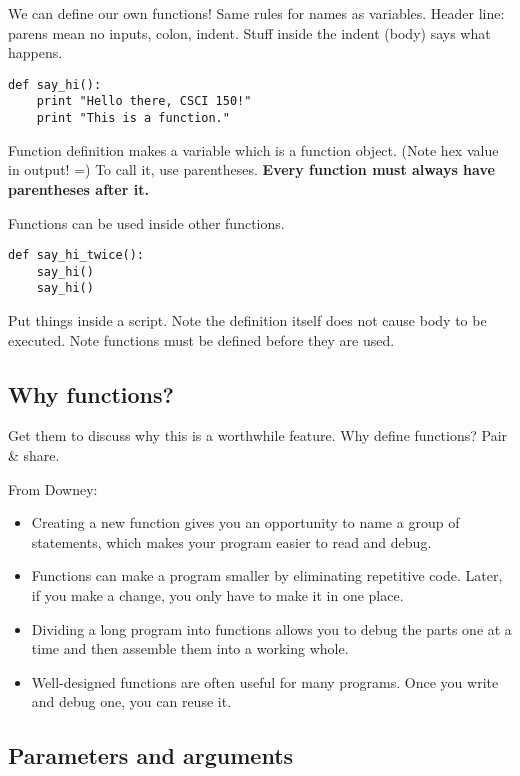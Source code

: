 \documentclass{article}
\begin{document}
We can define our own functions!  Same rules for names as
variables. Header line: parens mean no inputs, colon, indent.  Stuff
inside the indent (body) says what happens.

\begin{verbatim}
def say_hi():
    print "Hello there, CSCI 150!"
    print "This is a function."
\end{verbatim}

Function definition makes a variable which is a function object. (Note
hex value in output! =) To call it, use parentheses.  \textbf{Every
  function must always have parentheses after it.}

Functions can be used inside other functions.

\begin{verbatim}
def say_hi_twice():
    say_hi()
    say_hi()
\end{verbatim}

Put things inside a script.  Note the definition itself does not cause
body to be executed.  Note functions must be defined before they are
used.

\subsection*{Why functions?}

Get them to discuss why this is a worthwhile feature.  Why define
functions?  Pair \& share.

From Downey:

\begin{itemize}
\item Creating a new function gives you an opportunity to name a group
  of statements, which makes your program easier to read and debug.
\item  Functions can make a program smaller by eliminating repetitive code.
  Later, if you make a change, you only have to make it in one place.
\item Dividing a long program into
  functions allows you to debug the parts one at a time and then
  assemble them into a working whole.
\item Well-designed functions are often useful for many programs.
  Once you write and debug one, you can reuse it.
\end{itemize}

\subsection*{Parameters and arguments}
\end{document}
